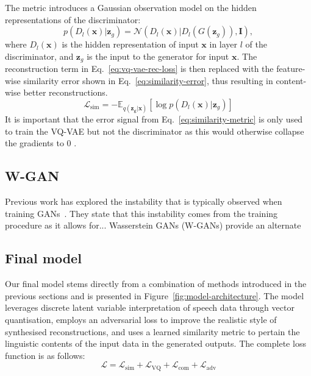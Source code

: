 \documentclass{article}
\DeclareMathOperator{\VQ}{VQ}
\begin{document}
The metric introduces a Gaussian observation model on the hidden representations of the discriminator:
\begin{equation}
    \label{eq:similarity-metric}
    p(D_l(\mathbf{x})|\mathbf{z}_g) = \mathcal{N}(D_l(\mathbf{x})|D_l(G(\mathbf{z}_g)), \mathbf{I}),
\end{equation}
where $D_l(\mathbf{x})$ is the hidden representation of input $\mathbf{x}$ in layer $l$ of the discriminator, and $\mathbf{z}_g$ is the input to the generator for input $\mathbf{x}$. 
The reconstruction term in Eq.~\ref{eq:vq-vae-rec-loss} is then replaced with the feature-wise similarity error shown in Eq.~\ref{eq:similarity-error}, thus resulting in content-wise better reconstructions.
\begin{equation}
    \label{eq:similarity-error}
    \mathcal{L}_{\text{sim}} = - \mathbb{E}_{q(\mathbf{z_g}|\mathbf{x})}[\log p(D_l(\mathbf{x})|\mathbf{z}_g)]
\end{equation}
It is important that the error signal from Eq.~\ref{eq:similarity-metric} is only used to train the VQ-VAE but not the discriminator as this would otherwise collapse the gradients to 0 \citep{Larsen2015}.


\subsection{W-GAN}
Previous work has explored the instability that is typically observed when training GANs~\cite{arjovsky2017towards}.
They state that this instability comes from the training procedure as it allows for...
Wasserstein GANs (W-GANs) provide an alternate

\subsection{Final model}
Our final model stems directly from a combination of methods introduced in the previous sections and is presented in Figure~\ref{fig:model-architecture}. The model leverages discrete latent variable interpretation of speech data through vector quantisation, employs an adversarial loss to improve the realistic style of synthesised reconstructions, and uses a learned similarity metric to pertain the linguistic contents of the input data in the generated outputs. The complete loss function is as follows:
\begin{equation}
    \mathcal{L} = \mathcal{L}_{\text{sim}} + \mathcal{L}_{\VQ} + \mathcal{L}_{\text{com}} + \mathcal{L}_{\text{adv}}
\end{equation}
\end{document}

